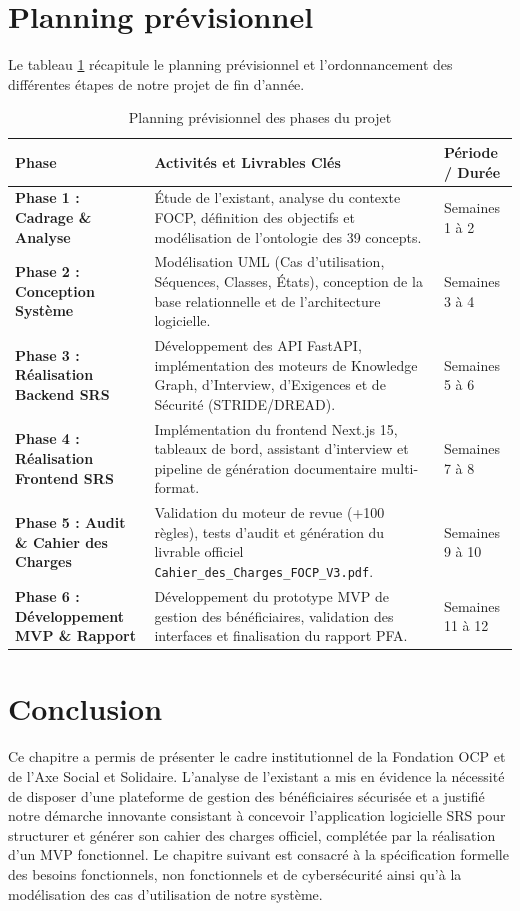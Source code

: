 \section{Planning prévisionnel}

Le tableau \ref{tab:planning} récapitule le planning prévisionnel et l'ordonnancement des différentes étapes de notre projet de fin d'année.

\begin{table}[H]
\centering
\small
\caption{Planning prévisionnel des phases du projet}
\label{tab:planning}
\begin{tabularx}{\textwidth}{|p{3.8cm}|X|p{2.8cm}|}
\hline
\rowcolor{focpgreen!18}
\textbf{Phase} & \textbf{Activités et Livrables Clés} & \textbf{Période / Durée} \\
\hline
\textbf{Phase 1 : Cadrage \& Analyse} & Étude de l'existant, analyse du contexte FOCP, définition des objectifs et modélisation de l'ontologie des 39 concepts. & Semaines 1 à 2 \\
\hline
\textbf{Phase 2 : Conception Système} & Modélisation UML (Cas d'utilisation, Séquences, Classes, États), conception de la base relationnelle et de l'architecture logicielle. & Semaines 3 à 4 \\
\hline
\textbf{Phase 3 : Réalisation Backend SRS} & Développement des API FastAPI, implémentation des moteurs de Knowledge Graph, d'Interview, d'Exigences et de Sécurité (STRIDE/DREAD). & Semaines 5 à 6 \\
\hline
\textbf{Phase 4 : Réalisation Frontend SRS} & Implémentation du frontend Next.js 15, tableaux de bord, assistant d'interview et pipeline de génération documentaire multi-format. & Semaines 7 à 8 \\
\hline
\textbf{Phase 5 : Audit \& Cahier des Charges} & Validation du moteur de revue (+100 règles), tests d'audit et génération du livrable officiel \texttt{Cahier\_des\_Charges\_FOCP\_V3.pdf}. & Semaines 9 à 10 \\
\hline
\textbf{Phase 6 : Développement MVP \& Rapport} & Développement du prototype MVP de gestion des bénéficiaires, validation des interfaces et finalisation du rapport PFA. & Semaines 11 à 12 \\
\hline
\end{tabularx}
\end{table}

\section{Conclusion}

Ce chapitre a permis de présenter le cadre institutionnel de la Fondation OCP et de l'Axe Social et Solidaire. L'analyse de l'existant a mis en évidence la nécessité de disposer d'une plateforme de gestion des bénéficiaires sécurisée et a justifié notre démarche innovante consistant à concevoir l'application logicielle SRS pour structurer et générer son cahier des charges officiel, complétée par la réalisation d'un MVP fonctionnel. Le chapitre suivant est consacré à la spécification formelle des besoins fonctionnels, non fonctionnels et de cybersécurité ainsi qu'à la modélisation des cas d'utilisation de notre système.

\newpage

